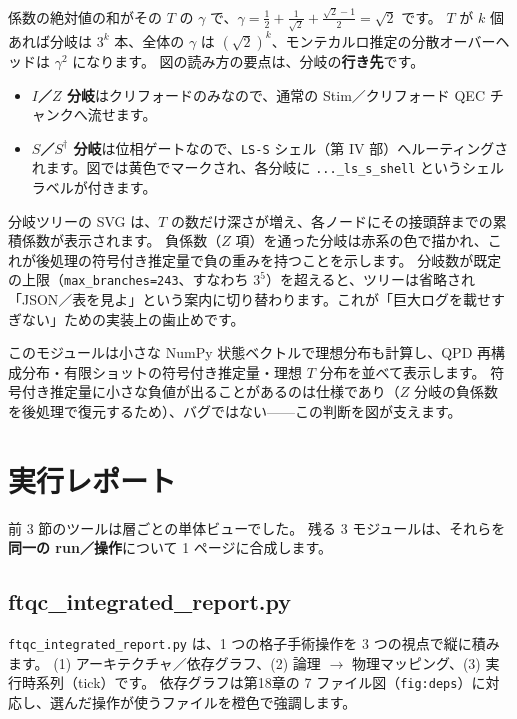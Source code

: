 係数の絶対値の和がその $T$ の $\gamma$ で、$\gamma = \tfrac12 + \tfrac{1}{\sqrt2} + \tfrac{\sqrt2-1}{2} = \sqrt2$ です。
$T$ が $k$ 個あれば分岐は $3^k$ 本、全体の $\gamma$ は $(\sqrt2)^k$、モンテカルロ推定の分散オーバーヘッドは $\gamma^2$ になります。
図の読み方の要点は、分岐の\textbf{行き先}です。

\begin{itemize}
  \item \textbf{$I$／$Z$ 分岐}はクリフォードのみなので、通常の Stim／クリフォード QEC チャンクへ流せます。
  \item \textbf{$S$／$S^\dagger$ 分岐}は位相ゲートなので、\texttt{LS-S} シェル（第 IV 部）へルーティングされます。図では黄色でマークされ、各分岐に \texttt{...\_ls\_s\_shell} というシェルラベルが付きます。
\end{itemize}

分岐ツリーの SVG は、$T$ の数だけ深さが増え、各ノードにその接頭辞までの累積係数が表示されます。
負係数（$Z$ 項）を通った分岐は赤系の色で描かれ、これが後処理の符号付き推定量で負の重みを持つことを示します。
分岐数が既定の上限（\texttt{max\_branches=243}、すなわち $3^5$）を超えると、ツリーは省略され「JSON／表を見よ」という案内に切り替わります。これが「巨大ログを載せすぎない」ための実装上の歯止めです。

このモジュールは小さな NumPy 状態ベクトルで理想分布も計算し、QPD 再構成分布・有限ショットの符号付き推定量・理想 $T$ 分布を並べて表示します。
符号付き推定量に小さな負値が出ることがあるのは仕様であり（$Z$ 分岐の負係数を後処理で復元するため）、バグではない——この判断を図が支えます。

\section{実行レポート}\label{sec:reports}

前 3 節のツールは層ごとの単体ビューでした。
残る 3 モジュールは、それらを\textbf{同一の run／操作}について 1 ページに合成します。

\subsection{ftqc\_integrated\_report.py}

\texttt{ftqc\_integrated\_report.py} は、1 つの格子手術操作を 3 つの視点で縦に積みます。
(1) アーキテクチャ／依存グラフ、(2) 論理 $\to$ 物理マッピング、(3) 実行時系列（tick）です。
依存グラフは第18章の 7 ファイル図（\texttt{fig:deps}）に対応し、選んだ操作が使うファイルを橙色で強調します。

